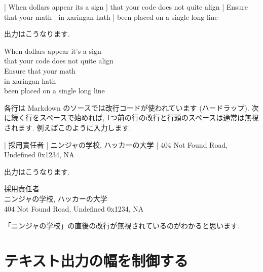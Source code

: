 \documentclass[
  11pt,
  lualatex,ja=standard,jafont=noto]{bxjsreport}
\newenvironment{Shaded}{\begin{snugshade}}{\end{snugshade}}
\newcommand{\NormalTok}[1]{#1}
\renewenvironment{quote}{\def\FrameCommand{{\color{quotebarcolor}{\vrule width 3pt}}\hspace{10pt}}\MakeFramed{\advance\hsize-\width\FrameRestore}}{\endMakeFramed}
\begin{document}
\begin{Shaded}
\begin{Highlighting}[]
\NormalTok{| When dollars appear it\textquotesingle{}s a sign}
\NormalTok{|   that your code does not quite align  }
\NormalTok{| Ensure that your math  }
\NormalTok{|   in xaringan hath  }
\NormalTok{|   been placed on a single long line}
\end{Highlighting}
\end{Shaded}

出力はこうなります.

\begin{quote}
When dollars appear it's a sign\\
\hspace*{0.333em}\hspace*{0.333em}that your code does not quite align\\
Ensure that your math\\
\hspace*{0.333em}\hspace*{0.333em}in xaringan hath\\
\hspace*{0.333em}\hspace*{0.333em}been placed on a single long line
\end{quote}

各行は Markdown のソースでは改行コードが使われています (ハードラップ). 次に続く行をスペースで始めれば, 1つ前の行の改行と行頭のスペースは通常は無視されます. 例えばこのように入力します.

\begin{Shaded}
\begin{Highlighting}[]
\NormalTok{| 採用責任者}
\NormalTok{| ニンジャの学校,}
\NormalTok{  ハッカーの大学}
\NormalTok{| 404 Not Found Road,}
\NormalTok{  Undefined 0x1234, NA}
\end{Highlighting}
\end{Shaded}

出力はこうなります.

\begin{quote}
採用責任者\\
ニンジャの学校, ハッカーの大学\\
404 Not Found Road, Undefined 0x1234, NA
\end{quote}

「ニンジャの学校」の直後の改行が無視されているのがわかると思います.

\hypertarget{text-width}{%
\section{テキスト出力の幅を制御する}\label{text-width}}
\end{document}
